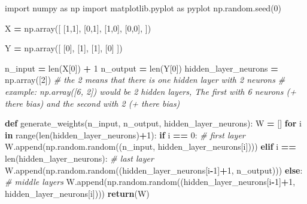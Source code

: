 \documentclass[
]{book}
\newenvironment{Shaded}{\begin{snugshade}}{\end{snugshade}}
\newcommand{\BuiltInTok}[1]{#1}
\newcommand{\CommentTok}[1]{\textcolor[rgb]{0.56,0.35,0.01}{\textit{#1}}}
\newcommand{\ControlFlowTok}[1]{\textcolor[rgb]{0.13,0.29,0.53}{\textbf{#1}}}
\newcommand{\DecValTok}[1]{\textcolor[rgb]{0.00,0.00,0.81}{#1}}
\newcommand{\ImportTok}[1]{#1}
\newcommand{\KeywordTok}[1]{\textcolor[rgb]{0.13,0.29,0.53}{\textbf{#1}}}
\newcommand{\NormalTok}[1]{#1}
\newcommand{\OperatorTok}[1]{\textcolor[rgb]{0.81,0.36,0.00}{\textbf{#1}}}
\begin{document}
\begin{Shaded}
\begin{Highlighting}[]
\ImportTok{import}\NormalTok{ numpy }\ImportTok{as}\NormalTok{ np}
\ImportTok{import}\NormalTok{ matplotlib.pyplot }\ImportTok{as}\NormalTok{ pyplot}
\NormalTok{np.random.seed(}\DecValTok{0}\NormalTok{)}

\NormalTok{X }\OperatorTok{=}\NormalTok{ np.array([}
\NormalTok{  [}\DecValTok{1}\NormalTok{,}\DecValTok{1}\NormalTok{],}
\NormalTok{  [}\DecValTok{0}\NormalTok{,}\DecValTok{1}\NormalTok{],}
\NormalTok{  [}\DecValTok{1}\NormalTok{,}\DecValTok{0}\NormalTok{],}
\NormalTok{  [}\DecValTok{0}\NormalTok{,}\DecValTok{0}\NormalTok{],}
\NormalTok{])}

\NormalTok{Y }\OperatorTok{=}\NormalTok{ np.array([}
\NormalTok{  [}\DecValTok{0}\NormalTok{],}
\NormalTok{  [}\DecValTok{1}\NormalTok{],}
\NormalTok{  [}\DecValTok{1}\NormalTok{],}
\NormalTok{  [}\DecValTok{0}\NormalTok{]}
\NormalTok{])}

\NormalTok{n\_input }\OperatorTok{=} \BuiltInTok{len}\NormalTok{(X[}\DecValTok{0}\NormalTok{]) }\OperatorTok{+} \DecValTok{1}
\NormalTok{n\_output }\OperatorTok{=} \BuiltInTok{len}\NormalTok{(Y[}\DecValTok{0}\NormalTok{])}
\NormalTok{hidden\_layer\_neurons }\OperatorTok{=}\NormalTok{ np.array([}\DecValTok{2}\NormalTok{]) }\CommentTok{\# the 2 means that there is one hidden layer with 2 neurons}
\CommentTok{\# example: np.array([6, 2]) would be 2 hidden layers, The first with 6 neurons (+ there bias) and the second with 2 (+ there bias)}


\KeywordTok{def}\NormalTok{ generate\_weights(n\_input, n\_output, hidden\_layer\_neurons):}
\NormalTok{  W }\OperatorTok{=}\NormalTok{ []}
  \ControlFlowTok{for}\NormalTok{ i }\KeywordTok{in} \BuiltInTok{range}\NormalTok{(}\BuiltInTok{len}\NormalTok{(hidden\_layer\_neurons)}\OperatorTok{+}\DecValTok{1}\NormalTok{):}
    \ControlFlowTok{if}\NormalTok{ i }\OperatorTok{==} \DecValTok{0}\NormalTok{: }\CommentTok{\# first layer}
\NormalTok{      W.append(np.random.random((n\_input, hidden\_layer\_neurons[i])))}
    \ControlFlowTok{elif}\NormalTok{ i }\OperatorTok{==} \BuiltInTok{len}\NormalTok{(hidden\_layer\_neurons): }\CommentTok{\# last layer}
\NormalTok{      W.append(np.random.random((hidden\_layer\_neurons[i}\OperatorTok{{-}}\DecValTok{1}\NormalTok{]}\OperatorTok{+}\DecValTok{1}\NormalTok{, n\_output)))}
    \ControlFlowTok{else}\NormalTok{: }\CommentTok{\# middle layers}
\NormalTok{      W.append(np.random.random((hidden\_layer\_neurons[i}\OperatorTok{{-}}\DecValTok{1}\NormalTok{]}\OperatorTok{+}\DecValTok{1}\NormalTok{, hidden\_layer\_neurons[i])))}
  \ControlFlowTok{return}\NormalTok{(W)}


\end{Highlighting}
\end{Shaded}
\end{document}
